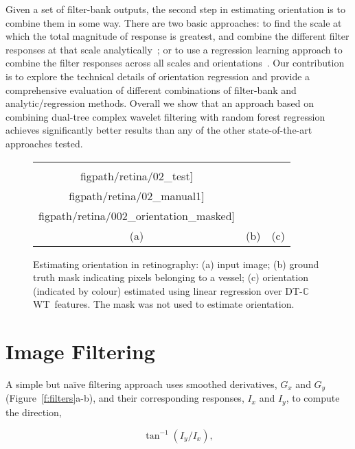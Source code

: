 \documentclass[10pt,twocolumn,letterpaper]{article}
\newcommand{\fref}[1]{Figure~\ref{#1}}
\def\Gx{G_x}
\def\Gy{G_y}
\def\Ix{I_x}
\def\Iy{I_y}
\def\dtcwt{DT-$\mathbb{C}$WT}
\begin{document}
Given a set of filter-bank outputs, the second step in estimating orientation is to combine them in some way. There are two basic approaches: to find the scale at which the total magnitude of response is greatest, and combine the different filter responses at that scale analytically~\cite{Karssemeijer_teBrake_TMI96,Mei_etal_IVC09}; or to use a regression learning approach to combine the filter responses across all scales and orientations~\cite{Berks_etal_IPMI11}. Our contribution is to explore the technical details of orientation regression and provide a comprehensive evaluation of different combinations of filter-bank and analytic/regression methods. Overall we show that an approach based on combining dual-tree complex wavelet filtering with random forest regression achieves significantly better results than any of the other state-of-the-art approaches tested.

\begin{figure}[t]
\centering
\begin{tabular}{c c c}
\texttt{[image: \\figpath/retina/02\_test]} &
\texttt{[image: \\figpath/retina/02\_manual1]} &
\texttt{[image: \\figpath/retina/002\_orientation\_masked]} \\
(a) & (b) & (c) \\
\end{tabular}
%
\caption{Estimating orientation in retinography: %
(a) input image; %
(b) ground truth mask indicating pixels belonging to a vessel; %
(c) orientation (indicated by colour) estimated using linear regression over \dtcwt~features. The mask was not used to estimate orientation. %
}
\label{f:retinography}
\end{figure}


\section{Image Filtering}
\label{s:filtering}
A simple but na\"ive filtering approach uses smoothed derivatives, $\Gx$ and $\Gy$ (\fref{f:filters}a-b), and their corresponding responses, $\Ix$ and $\Iy$, to compute the direction,

\begin{equation}
\tan^{-1}(\Iy/\Ix),
\label{e:1d}
\end{equation}
\end{document}
